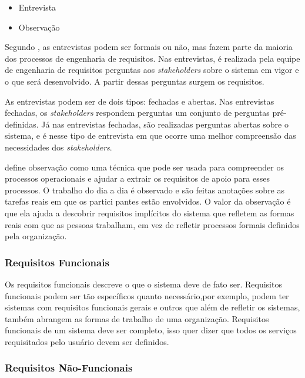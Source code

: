 \begin{itemize}
    \item Entrevista
    \item Observação
\end{itemize}

\label{sec:entrevista}

Segundo \cite{sommerville}, as entrevistas podem ser formais ou não, mas fazem parte da maioria dos processos de engenharia de requisitos. Nas entrevistas, é realizada pela equipe de engenharia de requisitos perguntas aos \textit{stakeholders} sobre o sistema em vigor e o que será desenvolvido. A partir dessas perguntas surgem os requisitos.

As entrevistas podem ser de dois tipos: fechadas e abertas. Nas entrevistas fechadas, os \textit{stakeholders} respondem perguntas um conjunto de perguntas pré-definidas. Já nas entrevistas fechadas, são realizadas perguntas abertas sobre o sistema, e é nesse tipo de entrevista em que ocorre uma melhor compreensão das necessidades dos \textit{stakeholders}.  

\label{sec:observacao}

\cite{sommerville} define observação como uma técnica que pode ser usada para compreender os processos operacionais e ajudar a extrair os requisitos de apoio para esses processos. O trabalho do dia a dia é observado e são feitas anotações sobre as tarefas reais em que os partici­
pantes estão envolvidos. O valor da observação é que ela ajuda a descobrir requisitos implícitos do sistema que refletem as formas reais com que as pessoas trabalham, em vez de refletir processos formais definidos pela organização.

\subsubsection{Requisitos Funcionais}
\label{sec:requisitos_funcionais}

Os requisitos funcionais descreve o que o sistema deve de fato ser. Requisitos funcionais podem ser tão específicos quanto necessário,por exemplo, podem ter sistemas com requisitos funcionais gerais e outros que além de refletir os sistemas, também abrangem as formas de trabalho de uma organização. Requisitos funcionais de um sistema deve ser completo, isso quer dizer que todos os serviços requisitados pelo usuário devem ser definidos.

\subsubsection{Requisitos Não-Funcionais}
\label{sec:requisitos_nao_funcionais}

